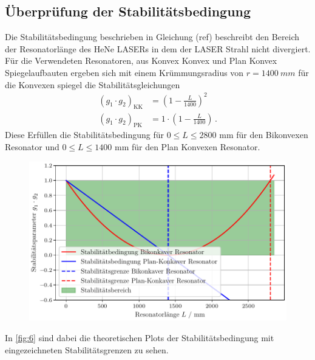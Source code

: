 \subsection{Überprüfung der Stabilitätsbedingung}
Die Stabilitätsbedingung beschrieben in Gleichung (ref) beschreibt den Bereich der Resonatorlänge des HeNe LASERs in dem der LASER Strahl nicht divergiert. 
Für die Verwendeten Resonatoren, aus Konvex Konvex und Plan Konvex Spiegelaufbauten ergeben sich mit einem Krümmungsradius von $r = \SI{1400}{mm}$ für die Konvexen spiegel die Stabilitätsgleichungen
\begin{align}
  \left(g_1 \cdot g_2\right)_{\text{KK}} &= \left( 1 - \frac{L}{1400} \right)^2 \\
  \left(g_1 \cdot g_2\right)_{\text{PK}} &= 1 \cdot \left( 1 - \frac{L}{1400} \right) \, .
\end{align}
Diese Erfüllen die Stabilitätsbedingung für $0 \leq L \leq 2800 \, \, \mathrm{mm}$ für den Bikonvexen Resonator und $0 \leq L \leq 1400 \, \, \mathrm{mm}$ für den Plan Konvexen Resonator.
\begin{figure}[H]
  \centering
  \includegraphics[width=\linewidth]{plots/stab_theo.pdf}
  \caption{}
  \label{fig:6}
\end{figure}
In \autoref{fig:6} sind dabei die theoretischen Plots der Stabilitätsbedingung mit eingezeichneten Stabilitätsgrenzen zu sehen. 
